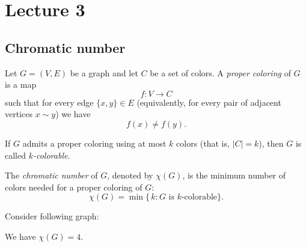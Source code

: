 \documentclass[11pt, a4paper]{ctexrep}
\begin{document}
\chapter{Lecture 3}

\section{Chromatic number}

\begin{definition}
    Let $G=(V,E)$ be a graph and let $C$ be a set of colors.
    A \emph{proper coloring} of $G$ is a map
    \[
        f: V \to C
    \]
    such that for every edge $ \{x,y\} \in E$ (equivalently, for every pair of adjacent
    vertices $x \sim y$) we have
    \[
        f(x) \neq f(y).
    \]

    If $G$ admits a proper coloring using at most $k$ colors (that is, $|C|=k$),
    then $G$ is called \emph{$k$-colorable}.

    The \emph{chromatic number} of $G$, denoted by $\chi(G)$, is the minimum number
    of colors needed for a proper coloring of $G$:
    \[
        \chi(G) = \min \{\, k : G \text{ is } k\text{-colorable} \}.
    \]
\end{definition}

\begin{example}
    Consider following graph:
    \begin{center}
    \end{center}
    We have $\chi(G)=4$.
\end{example}
\end{document}
